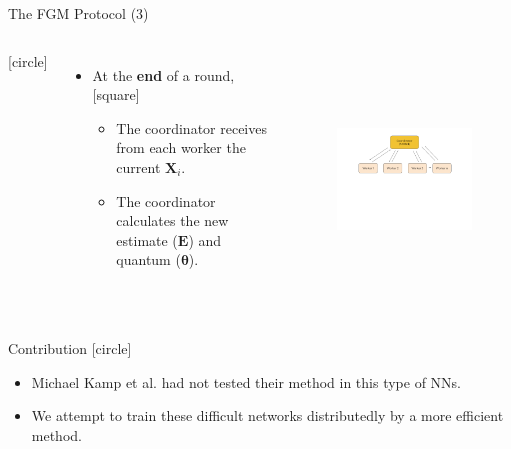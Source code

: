 \begin{frame}{The FGM Protocol (3)}
    \begin{columns}
        \vspace{-1cm}
        [circle]
        \begin{itemize}
            \item{At the \textbf{end} of a round,
            \vspace{0.2cm}
            [square]
            \begin{itemize}
                \item{The coordinator receives from each worker the current $\pmb{X}_i$.}
                \vspace{0.3cm}
                \item{The coordinator calculates the new estimate ($\pmb{E}$) and quantum ($\pmb{\theta}$).}
            \end{itemize}
            }
        \end{itemize}
        \begin{figure}
            \includegraphics[width=8.5cm,height=6cm,center]{images/ml-fgm-2.png}\label{fig:ml-fgm-3}
        \end{figure}
    \end{columns}
\end{frame}

\begin{frame}{Contribution}
    [circle]
    \begin{itemize}
        \item{Michael Kamp et al. had not tested their method in this type of NNs.}
        \vspace{1cm}
        \item{We attempt to train these difficult networks distributedly by a more efficient method.}
    \end{itemize}
\end{frame}
